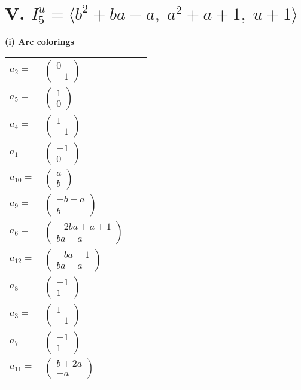 \documentclass[1p]{elsarticle_modified}
\theoremstyle{definition}
\begin{document}
\centering \section*{V. $I^u_{5}= \langle b^2+b a- a,\;a^2+a+1,\;u+1 \rangle$}
\flushleft \textbf{(i) Arc colorings}\\
\begin{tabular}{m{7pt} m{180pt} m{7pt} m{180pt} }
\flushright $a_{2}=$&$\begin{pmatrix}0\\-1\end{pmatrix}$ \\
\flushright $a_{5}=$&$\begin{pmatrix}1\\0\end{pmatrix}$ \\
\flushright $a_{4}=$&$\begin{pmatrix}1\\-1\end{pmatrix}$ \\
\flushright $a_{1}=$&$\begin{pmatrix}-1\\0\end{pmatrix}$ \\
\flushright $a_{10}=$&$\begin{pmatrix}a\\b\end{pmatrix}$ \\
\flushright $a_{9}=$&$\begin{pmatrix}- b+a\\b\end{pmatrix}$ \\
\flushright $a_{6}=$&$\begin{pmatrix}-2 b a+a+1\\b a- a\end{pmatrix}$ \\
\flushright $a_{12}=$&$\begin{pmatrix}- b a-1\\b a- a\end{pmatrix}$ \\
\flushright $a_{8}=$&$\begin{pmatrix}-1\\1\end{pmatrix}$ \\
\flushright $a_{3}=$&$\begin{pmatrix}1\\-1\end{pmatrix}$ \\
\flushright $a_{7}=$&$\begin{pmatrix}-1\\1\end{pmatrix}$ \\
\flushright $a_{11}=$&$\begin{pmatrix}b+2 a\\- a\end{pmatrix}$\\&\end{tabular}
\end{document}
